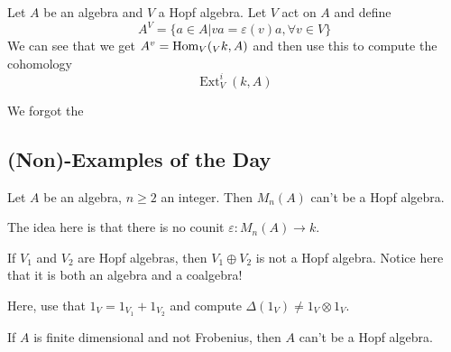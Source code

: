 \documentclass[12pt]{article}
\theoremstyle{break}
\theoremstyle{nonumberbreak}
\theoremstyle{changebreak}
\theoremstyle{break}
\theoremstyle{nonumberbreak}
\theoremstyle{nonumberplain}
\theoremstyle{change}
\DeclareMathOperator{\Ext}{Ext}
\newcommand*{\Hom}{\ensuremath\text{Hom}}
\begin{document}
Let $A$ be an algebra and $V$ a Hopf algebra. Let $V$ act on $A$ and define
\[A^V=\{a\in A|va=\varepsilon(v)a,\forall v\in V\}\]
We can see that we get $A^v=\Hom_V({_Vk},A)$ and then use this to compute the cohomology
\[\Ext_V^i(k,A)\]

We forgot the
\subsection{(Non)-Examples of the Day}
\begin{ex}
	Let $A$ be an algebra, $n\ge 2$ an integer. Then $M_n(A)$ can't be a Hopf algebra.

	The idea here is that there is no counit $\varepsilon:M_n(A)\to k$.
\end{ex}
\begin{ex}
	If $V_1$ and $V_2$ are Hopf algebras, then $V_1\oplus V_2$ is not a Hopf algebra.
	Notice here that it is both an algebra and a coalgebra!

	Here, use that $1_V=1_{V_1}+1_{V_2}$ and compute $\Delta(1_V)\ne 1_V\otimes 1_V$.
\end{ex}
\begin{ex}
	If $A$ is finite dimensional and not Frobenius, then $A$ can't be a Hopf algebra.
\end{ex}
\end{document}
